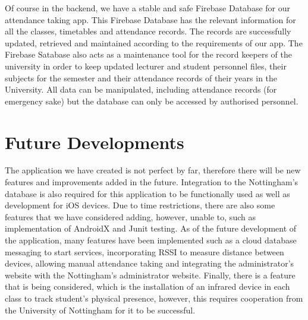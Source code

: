 \documentclass[../report.tex]{subfiles}
\begin{document}
Of course in the backend, we have a stable and safe Firebase Database for our attendance taking app. This Firebase Database has the relevant information for all the classes, timetables and attendance records. The records are successfully updated, retrieved and maintained according to the requirements of our app. The Firebase Satabase also acts as a maintenance tool for the record keepers of the university in order to keep updated lecturer and student personnel files, their subjects for the semester and their attendance records of their years in the University. All data can be manipulated, including attendance records (for emergency sake) but the database can only be accessed by authorised personnel.

\section{Future Developments}
The application we have created is not perfect by far, therefore there will be new features and improvements added in the future. Integration to the Nottingham’s database is also required for this application to be functionally used as well as development for iOS devices. Due to time restrictions, there are also some features that we have considered adding, however, unable to, such as implementation of AndroidX and Junit testing. As of the future development of the application, many features have been implemented such as a cloud database messaging to start services, incorporating RSSI to measure distance between devices, allowing manual attendance taking and integrating the administrator’s website with the Nottingham’s administrator website. Finally, there is a feature that is being considered, which is the installation of an infrared device in each class to track student’s physical presence, however, this requires cooperation from the University of Nottingham for it to be successful.
\end{document}
